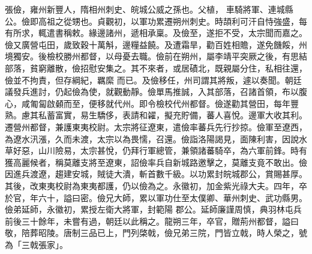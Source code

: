 \begin{pinyinscope}
 張儉，雍州新豐人，隋相州刺史、皖城公威之孫也。父植，
 車騎將軍、連城縣公。儉即高祖之從甥也。貞觀初，以軍功累遷朔州刺史。時頡利可汗自恃強盛，每有所求，輒遣書稱敕。緣邊諸州，遞相承稟。及儉至，遂拒不受，太宗聞而嘉之。儉又廣營屯田，歲致穀十萬斛，邊糧益饒。及遭霜旱，勸百姓相贍，遂免饑餒，州境獨安。後檢校勝州都督，以母憂去職。儉前在朔州，屬李靖平突厥之後，有思結部落，貧窮離散，儉招慰安集之。其不來者，或居磧北，既親屬分住，私相往還，儉並不拘責，但存綱紀，羈縻
 而已。及儉移任，州司謂其將叛，遽以奏聞。朝廷議發兵進討，仍起儉為使，就觀動靜。儉單馬推誠，入其部落，召諸首領，布以腹心，咸匍匐啟顙而至，便移就代州。即令檢校代州都督。儉遂勸其營田，每年豐熟。慮其私蓄富實，易生驕侈，表請和糴，擬充貯備，蕃人喜悅。邊軍大收其利。遷營州都督，兼護東夷校尉。太宗將征遼東，遣儉率蕃兵先行抄掠。儉軍至遼西，為遼水汛漲，久而未渡，太宗以為畏懦，召還。儉詣洛陽謁見，面陳利害，因說水
 草好惡，山川險易，太宗甚悅，仍拜行軍總管，兼領諸蕃騎卒，為六軍前鋒。時有獲高麗候者，稱莫離支將至遼東，詔儉率兵自新城路邀擊之，莫離支竟不敢出。儉因進兵渡遼，趨建安城，賊徒大潰，斬首數千級。以功累封皖城郡公，賞賜甚厚。其後，改東夷校尉為東夷都護，仍以儉為之。永徽初，加金紫光祿大夫。四年，卒於官，年六十，謚曰密。儉兄大師，累以軍功仕至太僕卿、華州刺史、武功縣男。儉弟延師，永徽初，累授左衛大將軍，封範陽
 郡公。延師廉謹周慎，典羽林屯兵前後三十餘年，未嘗有過，朝廷以此稱之。龍朔三年，卒官，贈荊州都督，謚曰敬，陪葬昭陵。唐制三品已上，門列棨戟，儉兄弟三院，門皆立戟，時人榮之，號為「三戟張家」。




\end{pinyinscope}
